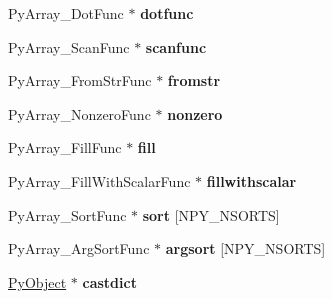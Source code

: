 \begin{DoxyCompactItemize}
\item 
Py\+Array\+\_\+\+Dot\+Func $\ast$ {\bfseries dotfunc}\hypertarget{structPyArray__ArrFuncs_a637d38146bb6da234b36619e5d6e6001}{}\label{structPyArray__ArrFuncs_a637d38146bb6da234b36619e5d6e6001}

\item 
Py\+Array\+\_\+\+Scan\+Func $\ast$ {\bfseries scanfunc}\hypertarget{structPyArray__ArrFuncs_a8b9358d751750ce3612a871f15b84e01}{}\label{structPyArray__ArrFuncs_a8b9358d751750ce3612a871f15b84e01}

\item 
Py\+Array\+\_\+\+From\+Str\+Func $\ast$ {\bfseries fromstr}\hypertarget{structPyArray__ArrFuncs_a52f8fc4fb604fd536aa3bff22ec43612}{}\label{structPyArray__ArrFuncs_a52f8fc4fb604fd536aa3bff22ec43612}

\item 
Py\+Array\+\_\+\+Nonzero\+Func $\ast$ {\bfseries nonzero}\hypertarget{structPyArray__ArrFuncs_a9922d000bf5a664af3267cdf07aca60b}{}\label{structPyArray__ArrFuncs_a9922d000bf5a664af3267cdf07aca60b}

\item 
Py\+Array\+\_\+\+Fill\+Func $\ast$ {\bfseries fill}\hypertarget{structPyArray__ArrFuncs_a1eb1f84c55cc701a21c1e649cd79d446}{}\label{structPyArray__ArrFuncs_a1eb1f84c55cc701a21c1e649cd79d446}

\item 
Py\+Array\+\_\+\+Fill\+With\+Scalar\+Func $\ast$ {\bfseries fillwithscalar}\hypertarget{structPyArray__ArrFuncs_a69ab4685e6c0c1f8eabca7819c8c7477}{}\label{structPyArray__ArrFuncs_a69ab4685e6c0c1f8eabca7819c8c7477}

\item 
Py\+Array\+\_\+\+Sort\+Func $\ast$ {\bfseries sort} \mbox{[}N\+P\+Y\+\_\+\+N\+S\+O\+R\+TS\mbox{]}\hypertarget{structPyArray__ArrFuncs_a902c30bc266fc1c7f1ab346fa8b90ed5}{}\label{structPyArray__ArrFuncs_a902c30bc266fc1c7f1ab346fa8b90ed5}

\item 
Py\+Array\+\_\+\+Arg\+Sort\+Func $\ast$ {\bfseries argsort} \mbox{[}N\+P\+Y\+\_\+\+N\+S\+O\+R\+TS\mbox{]}\hypertarget{structPyArray__ArrFuncs_a49503ae60eebb04f2f48e726e7cb2af8}{}\label{structPyArray__ArrFuncs_a49503ae60eebb04f2f48e726e7cb2af8}

\item 
\hyperlink{struct__object}{Py\+Object} $\ast$ {\bfseries castdict}\hypertarget{structPyArray__ArrFuncs_abc56ef6e5be3b17c390618ba753bd2d4}{}\label{structPyArray__ArrFuncs_abc56ef6e5be3b17c390618ba753bd2d4}


\end{DoxyCompactItemize}
